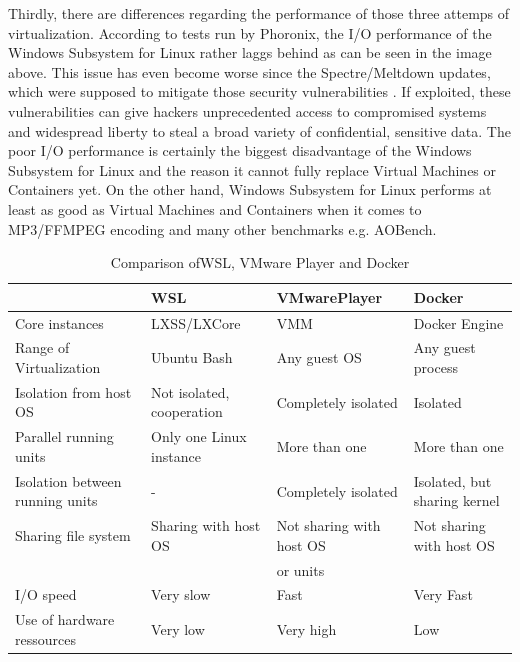 \documentclass[utf8,biblatex, ngerman, english]{lni}
\begin{document}
Thirdly, there are differences regarding the performance of those three attemps of virtualization. According to tests run by Phoronix, the I/O performance of the Windows Subsystem for Linux rather laggs behind as can be seen in the image above. This issue has even become worse since the Spectre/Meltdown updates, which were supposed to mitigate those security vulnerabilities . \glqq If exploited, these vulnerabilities can give hackers unprecedented access to compromised systems and widespread liberty to steal a broad variety of confidential, sensitive data. \grqq \cite{Md18} The poor I/O performance is certainly the biggest disadvantage of the Windows Subsystem for Linux and the reason it cannot fully replace Virtual Machines or Containers yet. On the other hand, Windows Subsystem for Linux performs at least as good as Virtual Machines and Containers when it comes to MP3/FFMPEG encoding and many other benchmarks e.g. AOBench.\cite{LP18}
\begin{table}
\centering
\begin{tabular}{|l||l||l|l|} 
\hline
& WSL & VMwarePlayer & Docker \\ \hline 
Core instances & LXSS/LXCore &  VMM & Docker Engine \\ \hline 
Range of Virtualization & Ubuntu Bash & Any guest OS & Any guest process \\ \hline
Isolation from host OS & Not isolated, cooperation & Completely isolated & Isolated \\ \hline
Parallel running units & Only one Linux instance & More than one  & More than one \\ \hline
Isolation between running units & -  &  Completely isolated & Isolated, but sharing kernel\\ \hline 
Sharing file system &  Sharing with host OS & Not sharing with host OS & Not sharing with host OS \\ 
& & or units & \\ \hline
I/O speed & Very slow & Fast & Very Fast \\ \hline
Use of hardware ressources & Very low & Very high & Low \\ \hline

\end{tabular}
\caption{Comparison ofWSL, VMware Player and Docker}
\label{tab:demo}
\end{table}
\end{document}
